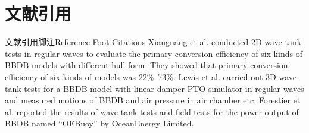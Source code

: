 \documentclass[aspectratio=169, UTF8]{ctexbeamer}
\begin{document}
\section[Reference Citations]{文献引用}

\begin{frame}{文献引用脚注}{Reference Foot Citations}
    Xianguang et al. conducted 2D wave tank tests in regular waves to evaluate the primary conversion efficiency of six kinds of BBDB models with different hull form. They showed that primary conversion efficiency of six kinds of models was 22\%~73\%. Lewis et al.  carried out 3D wave tank tests for a BBDB model with linear damper PTO simulator in regular waves and measured motions of BBDB and air pressure in air chamber etc. Forestier et al.  reported the results of wave tank tests and field tests for the power output of BBDB named “OEBuoy” by OceanEnergy Limited.
\end{frame}

\end{document}

